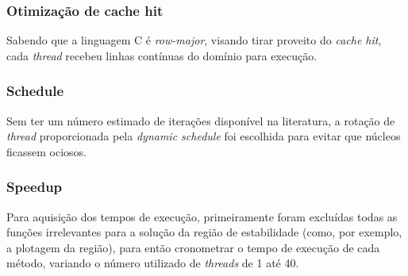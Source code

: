 \documentclass[a4paper,12pt]{article}
\begin{document}
\subsubsection{Otimização de cache hit}
Sabendo que a linguagem C é \textit{row-major}, visando tirar proveito do \textit{cache hit}, cada \textit{thread} recebeu linhas contínuas do domínio para execução.
\subsubsection{Schedule}
Sem ter um número estimado de iterações disponível na literatura, a rotação de \textit{thread} proporcionada pela \textit{dynamic schedule} foi escolhida para evitar que núcleos ficassem ociosos.
\subsubsection{Speedup}
Para aquisição dos tempos de execução, primeiramente foram excluídas todas as funções irrelevantes para a solução da região de estabilidade (como, por exemplo, a plotagem da região), para então cronometrar o tempo de execução de cada método, variando o número utilizado de \textit{threads} de 1 até 40.\\









\end{document}
